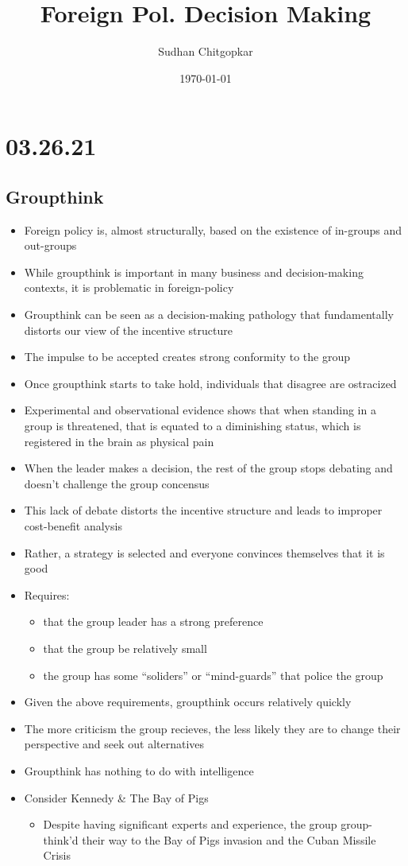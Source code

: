 \documentclass[11pt]{article}
\author{Sudhan Chitgopkar}
\date{\today}
\title{Foreign Pol. Decision Making}
\begin{document}
\maketitle
\section*{03.26.21}
\label{sec:org62327cf}
\subsection*{Groupthink}
\label{sec:org769315f}
\begin{itemize}
\item Foreign policy is, almost structurally, based on the existence of in-groups and out-groups
\item While groupthink is important in many business and decision-making contexts, it is problematic in foreign-policy
\item Groupthink can be seen as a decision-making pathology that fundamentally distorts our view of the incentive structure
\item The impulse to be accepted creates strong conformity to the group
\item Once groupthink starts to take hold, individuals that disagree are ostracized
\item Experimental and observational evidence shows that when standing in a group is threatened, that is equated to a diminishing status, which is registered in the brain as physical pain
\item When the leader makes a decision, the rest of the group stops debating and doesn't challenge the group concensus
\item This lack of debate distorts the incentive structure and leads to improper cost-benefit analysis
\item Rather, a strategy is selected and everyone convinces themselves that it is good
\item Requires:
\begin{itemize}
\item that the group leader has a strong preference
\item that the group be relatively small
\item the group has some ``soliders'' or ``mind-guards'' that police the group
\end{itemize}
\item Given the above requirements, groupthink occurs relatively quickly
\item The more criticism the group recieves, the less likely they are to change their perspective and seek out alternatives
\item Groupthink has nothing to do with intelligence
\item Consider Kennedy \& The Bay of Pigs
\begin{itemize}
\item Despite having significant experts and experience, the group group-think'd their way to the Bay of Pigs invasion and the Cuban Missile Crisis
\end{itemize}
\end{itemize}
\end{document}
